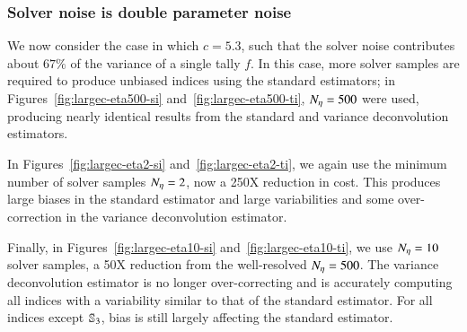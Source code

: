 \subsubsection{Solver noise is double parameter noise}
We now consider the case in which $c=5.3$, such that the solver noise contributes about $67\%$ of the variance of a single tally $f$.
In this case, more solver samples are required to produce unbiased indices using the standard estimators; in Figures~\ref{fig:largec-eta500-si} and~\ref{fig:largec-eta500-ti}, $\Neta=500$ were used, producing nearly identical results from the standard and variance deconvolution estimators.

In Figures~\ref{fig:largec-eta2-si} and~\ref{fig:largec-eta2-ti}, we again use the minimum number of solver samples $\Neta=2$, now a 250X reduction in cost. This produces large biases in the standard estimator and large variabilities and some over-correction in the variance deconvolution estimator.

Finally, in Figures~\ref{fig:largec-eta10-si} and~\ref{fig:largec-eta10-ti}, we use $\Neta=10$ solver samples, a 50X reduction from the well-resolved $\Neta=500$.
The variance deconvolution estimator is no longer over-correcting and is accurately computing all indices with a variability similar to that of the standard estimator.
For all indices except $\S{3}$, bias is still largely affecting the standard estimator.

